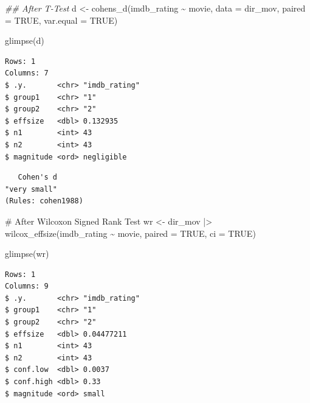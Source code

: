 \documentclass[
  letterpaper,
]{krantz}
\makeatletter
\newenvironment{Shaded}{\begin{snugshade}}{\end{snugshade}}
\newcommand{\AttributeTok}[1]{\textcolor[rgb]{0.40,0.45,0.13}{#1}}
\newcommand{\CommentTok}[1]{\textcolor[rgb]{0.37,0.37,0.37}{#1}}
\newcommand{\ConstantTok}[1]{\textcolor[rgb]{0.56,0.35,0.01}{#1}}
\newcommand{\DocumentationTok}[1]{\textcolor[rgb]{0.37,0.37,0.37}{\textit{#1}}}
\newcommand{\FunctionTok}[1]{\textcolor[rgb]{0.28,0.35,0.67}{#1}}
\newcommand{\NormalTok}[1]{\textcolor[rgb]{0.00,0.23,0.31}{#1}}
\newcommand{\OtherTok}[1]{\textcolor[rgb]{0.00,0.23,0.31}{#1}}
\newcommand{\SpecialCharTok}[1]{\textcolor[rgb]{0.37,0.37,0.37}{#1}}
\newenvironment{kframe}{%
\medskip{}
\setlength{\fboxsep}{.8em}
 \def\at@end@of@kframe{}%
 \ifinner\ifhmode%
  \def\at@end@of@kframe{\end{minipage}}%
  \begin{minipage}{\columnwidth}%
 \fi\fi%
 \def\FrameCommand##1{\hskip\@totalleftmargin \hskip-\fboxsep
 \colorbox{shadecolor}{##1}\hskip-\fboxsep
     \hskip-\linewidth \hskip-\@totalleftmargin \hskip\columnwidth}%
 \MakeFramed {\advance\hsize-\width
   \@totalleftmargin\z@ \linewidth\hsize
   \@setminipage}}%
 {\par\unskip\endMakeFramed%
 \at@end@of@kframe}
\renewenvironment{Shaded}{\begin{kframe}}{\end{kframe}}
\makeatother
\begin{document}
\begin{Shaded}
\begin{Highlighting}[]
\DocumentationTok{\#\# After T{-}Test}
\NormalTok{d }\OtherTok{\textless{}{-}} \FunctionTok{cohens\_d}\NormalTok{(imdb\_rating }\SpecialCharTok{\textasciitilde{}}\NormalTok{ movie,}
               \AttributeTok{data =}\NormalTok{ dir\_mov,}
               \AttributeTok{paired =} \ConstantTok{TRUE}\NormalTok{,}
               \AttributeTok{var.equal =} \ConstantTok{TRUE}\NormalTok{)}

\FunctionTok{glimpse}\NormalTok{(d)}
\end{Highlighting}
\end{Shaded}

\begin{verbatim}
Rows: 1
Columns: 7
$ .y.       <chr> "imdb_rating"
$ group1    <chr> "1"
$ group2    <chr> "2"
$ effsize   <dbl> 0.132935
$ n1        <int> 43
$ n2        <int> 43
$ magnitude <ord> negligible
\end{verbatim}

\begin{Shaded}
\end{Shaded}

\begin{verbatim}
   Cohen's d 
"very small" 
(Rules: cohen1988)
\end{verbatim}

\begin{Shaded}
\begin{Highlighting}[]
\CommentTok{\# After Wilcoxon Signed Rank Test}
\NormalTok{wr }\OtherTok{\textless{}{-}}
\NormalTok{  dir\_mov }\SpecialCharTok{|\textgreater{}}
  \FunctionTok{wilcox\_effsize}\NormalTok{(imdb\_rating }\SpecialCharTok{\textasciitilde{}}\NormalTok{ movie,}
                   \AttributeTok{paired =} \ConstantTok{TRUE}\NormalTok{, }\AttributeTok{ci =} \ConstantTok{TRUE}\NormalTok{)}

\FunctionTok{glimpse}\NormalTok{(wr)}
\end{Highlighting}
\end{Shaded}

\begin{verbatim}
Rows: 1
Columns: 9
$ .y.       <chr> "imdb_rating"
$ group1    <chr> "1"
$ group2    <chr> "2"
$ effsize   <dbl> 0.04477211
$ n1        <int> 43
$ n2        <int> 43
$ conf.low  <dbl> 0.0037
$ conf.high <dbl> 0.33
$ magnitude <ord> small
\end{verbatim}
\end{document}

